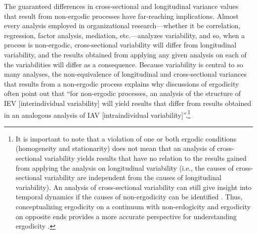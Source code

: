 \documentclass[
12pt, %
twoside,
english]{guelphthesis}
\begin{document}
The guaranteed differences in cross-sectional and longitudinal variance values that result from non-ergodic processes have far-reaching implications. Almost every analysis employed in organizational research---whether it be correlation, regression, factor analysis, mediation, etc.---analyzes variability, and so, when a process is non-ergodic, cross-sectional variability will differ from longitudinal variability, and the results obtained from applying any given analysis on each of the variabilities will differ as a consequence. Because variability is central to so many analyses, the non-equivalence of longitudinal and cross-sectional variances that results from a non-ergodic process explains why discussions of ergodicity often point out that ``for non-ergodic processes, an analysis of the structure of IEV {[}interindividual variability{]} will yield results that differ from results obtained in an analogous analysis of IAV {[}intraindividual variability{]}''\autocite[p.~202]{molenaar2004}.\footnote{It is important to note that a violation of one or both ergodic conditions (homogeneity and stationarity) does not mean that an analysis of cross-sectional variability yields results that have no relation to the results gained from applying the analysis on longitudinal variability (i.e., the causes of cross-sectional variability are independent from the causes of longitudinal variability). An analysis of cross-sectional variability can still give insight into temporal dynamics if the causes of non-ergodicity can be identified \parencites{voelkle2014}[for similar discussion, see][]{spector2019}. Thus, conceptualizing ergodicity on a continuum with non-erdogicity and ergodicity on opposite ends provides a more accurate perspective for understanding ergodicity \parencites{adolf2019}{medaglia2019}.}
\end{document}
